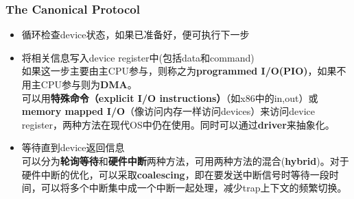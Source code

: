 \documentclass{article}
\begin{document}
\subsubsection{The Canonical Protocol}
\begin{itemize}
    \item 循环检查device状态，如果已准备好，便可执行下一步
    \item 将相关信息写入device register中(包括data和command) \\
    如果这一步主要由主CPU参与，则称之为\textbf{programmed I/O(PIO)}，如果不用主CPU参与则为\textbf{DMA}。\\
    可以用\textbf{特殊命令（explicit I/O instructions）}（如x86中的in,out）或\textbf{memory mapped I/O}（像访问内存一样访问devices）来访问device register，两种方法在现代OS中仍在使用。同时可以通过\textbf{driver}来抽象化。
    \item 等待直到device返回信息 \\
    可以分为\textbf{轮询等待}和\textbf{硬件中断}两种方法，可用两种方法的混合(\textbf{hybrid})。对于硬件中断的优化，可以采取\textbf{coalescing}，即在要发送中断信号时等待一段时间，可以将多个中断集中成一个中断一起处理，减少trap上下文的频繁切换。
\end{itemize}
\end{document}
